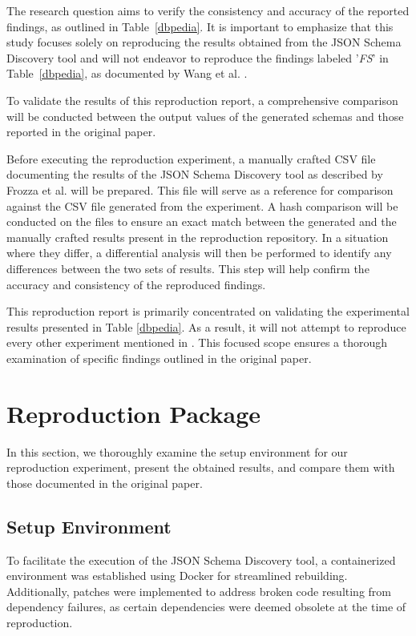 \documentclass[sigconf, nonacm]{acmart}
\begin{document}
The research question aims to verify the consistency and accuracy of the reported findings, as outlined in Table~\ref{dbpedia}. It is important to emphasize that this study focuses solely on reproducing the results obtained from the JSON Schema Discovery tool and will not endeavor to reproduce the findings labeled '\textit{FS}' in Table~\ref{dbpedia}, as documented by Wang et al. \cite{wang2015schema}.

To validate the results of this reproduction report, a comprehensive comparison will be conducted between the output values of the generated schemas and those reported in the original paper.
 
Before executing the reproduction experiment, a manually crafted CSV file documenting the results of the JSON Schema Discovery tool as described by Frozza et al. \cite{frozza2018approach} will be prepared. This file will serve as a reference for comparison against the CSV file generated from the experiment. A hash comparison will be conducted on the files to ensure an exact match between the generated and the manually crafted results present in the reproduction repository.  In a situation where they differ, a differential analysis will then be performed to identify any differences between the two sets of results. This step will help confirm the accuracy and consistency of the reproduced findings. 

This reproduction report is primarily concentrated on validating the experimental results presented in Table \ref{dbpedia}. As a result, it will not attempt to reproduce every other experiment mentioned in \cite{frozza2018approach}. This focused scope ensures a thorough examination of specific findings outlined in the original paper.

\section{Reproduction Package}
In this section, we thoroughly examine the setup environment for our reproduction experiment, present the obtained results, and compare them with those documented in the original paper.

\subsection{Setup Environment}
To facilitate the execution of the JSON Schema Discovery tool,  a containerized environment was established using Docker for streamlined rebuilding. Additionally, patches were implemented to address broken code resulting from dependency failures, as certain dependencies were deemed obsolete at the time of reproduction.
\end{document}
